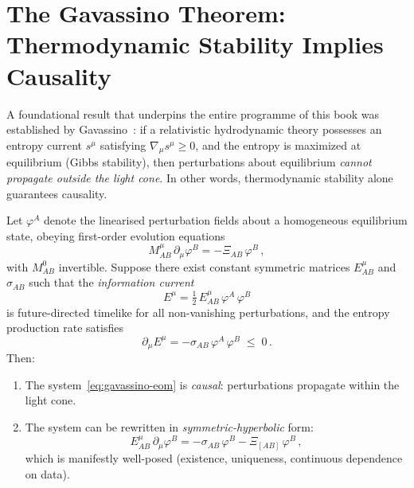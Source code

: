 \section{The Gavassino Theorem: Thermodynamic Stability Implies Causality}
\label{sec:gavassino-stability-causality}

A foundational result that underpins the entire programme of this book
was established by Gavassino~\citep{GavassinoCausality2021}: if a
relativistic hydrodynamic theory possesses an entropy current
$s^{\mu}$ satisfying $\nabla_{\mu} s^{\mu} \ge 0$, and the entropy is
maximized at equilibrium (Gibbs stability), then perturbations about
equilibrium \emph{cannot propagate outside the light cone}.  In other
words, thermodynamic stability alone guarantees causality.

\begin{tcolorbox}[colback=red!5!white, colframe=red!60!black,
  title={\textbf{Theorem (Gavassino 2021): Stability $\Rightarrow$ Causality}},
  fonttitle=\bfseries]
\label{thm:gavassino-stability-causality}
Let $\varphi^{A}$ denote the linearised perturbation fields about a
homogeneous equilibrium state, obeying first-order evolution equations
\begin{equation}
  M^{\mu}_{AB}\,\partial_{\mu}\varphi^{B} = -\Xi_{AB}\,\varphi^{B}\,,
  \label{eq:gavassino-eom}
\end{equation}
with $M^{0}_{AB}$ invertible.  Suppose there exist constant symmetric
matrices $E^{\mu}_{AB}$ and $\sigma_{AB}$ such that the
\emph{information current}
\begin{equation}
  E^{\mu} = \tfrac{1}{2}\,E^{\mu}_{AB}\,\varphi^{A}\,\varphi^{B}
  \label{eq:gavassino-info-current}
\end{equation}
is future-directed timelike for all non-vanishing perturbations, and
the entropy production rate satisfies
\begin{equation}
  \partial_{\mu} E^{\mu} = -\sigma_{AB}\,\varphi^{A}\,\varphi^{B}
  \;\le\; 0\,.
  \label{eq:gavassino-entropy-prod}
\end{equation}
Then:
\begin{enumerate}
  \item[\textbf{(I)}] The system~\eqref{eq:gavassino-eom} is
    \emph{causal}: perturbations propagate within the light cone.
  \item[\textbf{(II)}] The system can be rewritten in
    \emph{symmetric-hyperbolic} form:
    \begin{equation}
      E^{\mu}_{AB}\,\partial_{\mu}\varphi^{B}
      = -\sigma_{AB}\,\varphi^{B}
        - \Xi_{[AB]}\,\varphi^{B}\,,
      \label{eq:gavassino-symhyp}
    \end{equation}
    which is manifestly well-posed (existence, uniqueness, continuous
    dependence on data).
\end{enumerate}
\end{tcolorbox}

